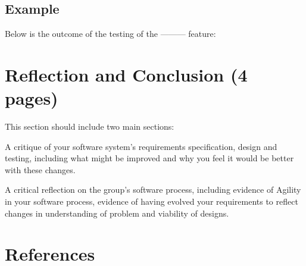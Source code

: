 \documentclass[12pt]{article}
\begin{document}
\subsection{Example}
Below is the outcome of the testing of the --------- feature:

\section{Reflection and Conclusion (4 pages)}

This section should include two main sections:

A critique of your software system’s requirements specification, design and testing,
including what might be improved and why you feel it would be better with these
changes.

A critical reflection on the group’s software process, including evidence of Agility in
your software process, evidence of having evolved your requirements to reflect
changes in understanding of problem and viability of designs.


\section{References}
\end{document}

